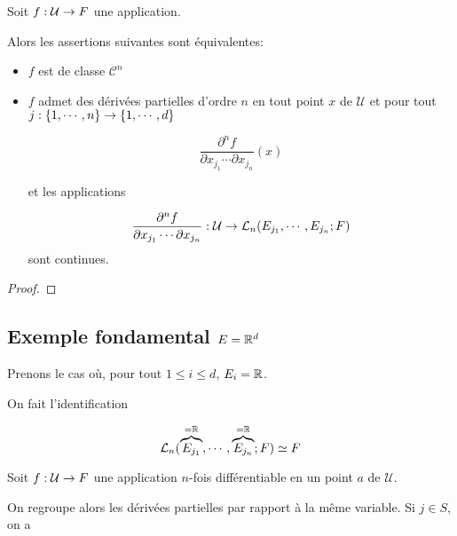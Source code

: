 \begin{proposition} 
	Soit $\GSfunction{f}{\mathcal{U}}{F}$ une application.

	Alors les assertions suivantes sont équivalentes:

	\begin{itemize}
		\item $f$ est de classe $\mathcal{C}^{n}$
		\item $f$ admet des dérivées partielles d'ordre $n$ en tout point $x$ de
			$\mathcal{U}$ et pour tout $j : \GSset{1, \cdots, n} \rightarrow
			\GSset{1, \cdots, d}$

			\begin{equation*}
				\frac{\partial^{n} f}{\partial x_{j_{1}} \cdots \partial
				x_{j_{n}}} (x)
			\end{equation*}

			et les applications

			\begin{equation*}
				\frac{\partial^{n} f}{\partial x_{j_{1}} \cdots \partial
				x_{j_{n}}} : \mathcal{U} \rightarrow
				\GScontinueHomo[n]{E_{j_{1}}, \cdots, E_{j_{n}}}{F}
			\end{equation*}
			sont continues.
	\end{itemize}
\end{proposition}

\ifdefined\outputproof
\begin{proof}

\end{proof}
\fi

\subsection{Exemple fondamental $E = \real^{d}$}

Prenons le cas où, pour tout $1 \leq i \leq d$, $E_{i} = \real$.

On fait l'identification

\begin{equation*}
	\GScontinueHomo[n]{\overbrace{E_{j_{1}}}^{= \real}, \cdots,
	\overbrace{E_{j_{n}}}^{= \real}}{F} \isomorphe F
\end{equation*}

Soit $\GSfunction{f}{\mathcal{U}}{F}$ une application $n$-fois différentiable en
un point $a$ de $\mathcal{U}$.

On regroupe alors les dérivées partielles par rapport à la même variable. Si $j
\in S$, on a

